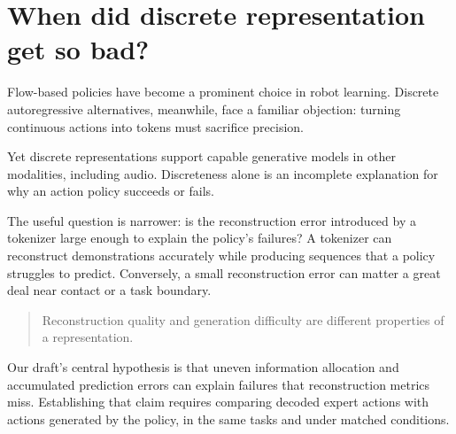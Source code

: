 \section{When did discrete representation get so bad?}

Flow-based policies have become a prominent choice in robot learning. Discrete
autoregressive alternatives, meanwhile, face a familiar objection: turning
continuous actions into tokens must sacrifice precision.

Yet discrete representations support capable generative models in other
modalities, including audio. Discreteness alone is an incomplete explanation for
why an action policy succeeds or fails.

The useful question is narrower: is the reconstruction error introduced by a
tokenizer large enough to explain the policy’s failures? A tokenizer can
reconstruct demonstrations accurately while producing sequences that a policy
struggles to predict. Conversely, a small reconstruction error can matter a
great deal near contact or a task boundary.

\begin{quote}
Reconstruction quality and generation difficulty are different properties of a
representation.
\end{quote}

Our draft’s central hypothesis is that uneven information allocation and
accumulated prediction errors can explain failures that reconstruction metrics
miss. Establishing that claim requires comparing decoded expert actions with
actions generated by the policy, in the same tasks and under matched conditions.
